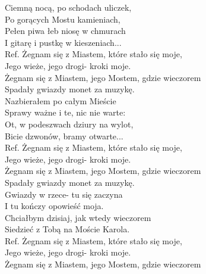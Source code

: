 
\begin{flushleft}
Ciemną nocą, po schodach uliczek, \tab{} \\
Po gorących Mostu kamieniach,  \tab{} \\
Pełen piwa łeb niosę w chmurach  \tab{} \\
I gitarę i pustkę w kieszeniach...  \tab{} \\
\vskip 3mm
Ref. Żegnam się z Miastem, które stało się moje, \\
\hspace{0.9cm}Jego wieże, jego drogi- kroki moje.  \tab{} \\
\hspace{0.9cm}Żegnam się z Miastem, jego Mostem, gdzie wieczorem \\
\hspace{0.9cm}Spadały gwiazdy monet za muzykę. \tab{}  \\
\vskip 3mm
Nazbierałem po całym Mieście \\
Sprawy ważne i te, nic nie warte: \\
Ot, w podeszwach dziury na wylot, \\
Bicie dzwonów, bramy otwarte... \\
\vskip 3mm
Ref. Żegnam się z Miastem, które stało się moje,\\
\hspace{0.9cm}Jego wieże, jego drogi- kroki moje. \\
\hspace{0.9cm}Żegnam się z Miastem, jego Mostem, gdzie wieczorem \\
\hspace{0.9cm}Spadały gwiazdy monet za muzykę. \\
\vskip 3mm
Gwiazdy w rzece- tu się zaczyna \\
I tu kończy opowieść moja. \\
Chciałbym dzisiaj, jak wtedy wieczorem \\
Siedzieć z Tobą na Moście Karola. \\
\vskip 3mm
Ref. Żegnam się z Miastem, które stało się moje,\\
\hspace{0.9cm}Jego wieże, jego drogi- kroki moje. \\
\hspace{0.9cm}Żegnam się z Miastem, jego Mostem, gdzie wieczorem \\

\end{flushleft}
